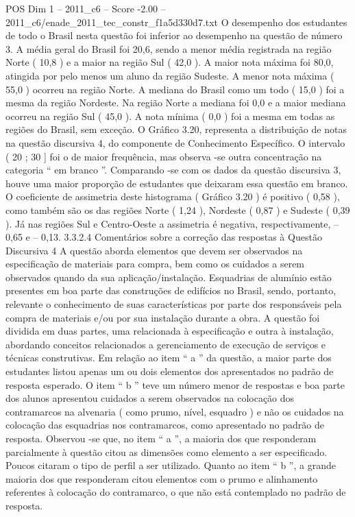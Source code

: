 \begin{textsample}{POS Dim 1 – 2011\_c6 – Score -2.00 – 2011\_c6/enade\_2011\_tec\_constr\_f1a5d330d7.txt}
O desempenho dos estudantes de todo o Brasil nesta questão foi inferior ao desempenho na questão de número 3.
A média geral do Brasil foi 20,6, sendo a menor média registrada na região Norte ( 10,8 ) e a maior na região Sul ( 42,0 ).
A maior nota máxima foi 80,0, atingida por pelo menos um aluno da região Sudeste.
A menor nota máxima ( 55,0 ) ocorreu na região Norte.
A mediana do Brasil como um todo ( 15,0 ) foi a mesma da região Nordeste.
Na região Norte a mediana foi 0,0 e a maior mediana ocorreu na região Sul ( 45,0 ).
A nota mínima ( 0,0 ) foi a mesma em todas as regiões do Brasil, sem exceção.
O Gráfico 3.20, representa a distribuição de notas na questão discursiva 4, do componente de Conhecimento Específico.
O intervalo ( 20 ; 30 ] foi o de maior frequência, mas observa -se outra concentração na categoria “ em branco ”.
Comparando -se com os dados da questão discursiva 3, houve uma maior proporção de estudantes que deixaram essa questão em branco.
O coeficiente de assimetria deste histograma ( Gráfico 3.20 ) é positivo ( 0,58 ), como também são os das regiões Norte ( 1,24 ), Nordeste ( 0,87 ) e Sudeste ( 0,39 ).
Já nas regiões Sul e Centro-Oeste a assimetria é negativa, respectivamente, – 0,65 e – 0,13. 3.3.2.4 Comentários sobre a correção das respostas à Questão Discursiva 4 A questão aborda elementos que devem ser observados na especificação de materiais para compra, bem como os cuidados a serem observados quando da sua aplicação/instalação.
Esquadrias de alumínio estão presentes em boa parte das construções de edifícios no Brasil, sendo, portanto, relevante o conhecimento de suas características por parte dos responsáveis pela compra de materiais e/ou por sua instalação durante a obra.
A questão foi dividida em duas partes, uma relacionada à especificação e outra à instalação, abordando conceitos relacionados a gerenciamento de execução de serviços e técnicas construtivas.
Em relação ao item “ a ” da questão, a maior parte dos estudantes listou apenas um ou dois elementos dos apresentados no padrão de resposta esperado.
O item “ b ” teve um número menor de respostas e boa parte dos alunos apresentou cuidados a serem observados na colocação dos contramarcos na alvenaria ( como prumo, nível, esquadro ) e não os cuidados na colocação das esquadrias nos contramarcos, como apresentado no padrão de resposta.
Observou -se que, no item “ a ”, a maioria dos que responderam parcialmente à questão citou as dimensões como elemento a ser especificado.
Poucos citaram o tipo de perfil a ser utilizado.
Quanto ao item “ b ”, a grande maioria dos que responderam citou elementos com o prumo e alinhamento referentes à colocação do contramarco, o que não está contemplado no padrão de resposta.

\end{textsample}
